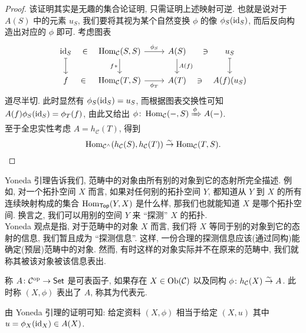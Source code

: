 \begin{proof}
    该证明其实是无趣的集合论证明, 只需证明上述映射可逆. 也就是说对于 $A(S)$ 中的元素 $u_S$, 我们要将其视为某个自然变换 $\phi$ 的像 $\phi_S(\mathrm{id}_S)$, 而后反向构造出对应的 $\phi$ 即可. 考虑图表
    \[\begin{tikzcd}
	{\identity_S} & {\Hom_{\cal{C}}(S,S)} & {A(S)} & {u_S} \\
	f & {\Hom_{\cal{C}}(T,S)} & {A(T)} & { A(f)(u_S)}
	\arrow["\in"{marking, allow upside down}, draw=none, from=1-1, to=1-2]
	\arrow[maps to, from=1-1, to=2-1]
	\arrow["{\phi_S}", from=1-2, to=1-3]
	\arrow["{f^{}*}"', from=1-2, to=2-2]
	\arrow["{A(f)}", from=1-3, to=2-3]
	\arrow["\in"{marking, allow upside down}, draw=none, from=1-4, to=1-3]
	\arrow[maps to, from=1-4, to=2-4]
	\arrow["\in"{marking, allow upside down}, draw=none, from=2-1, to=2-2]
	\arrow["{\phi_T}"', from=2-2, to=2-3]
	\arrow["\in"{marking, allow upside down}, draw=none, from=2-4, to=2-3]
    \end{tikzcd}\]
    道尽半切. 此时显然有 $\phi_S(\mathrm{id}_S) = u_S$, 而根据图表交换性可知 $A(f)\phi_S(\mathrm{id}_S) = \phi_T(f)$, 由此又给出 $\phi\colon \operatorname{Hom}_{\mathcal{C}}(-,S) \xRightarrow{\phi} A(-)$.\\
    至于全忠实性考虑 $A = h_{\mathcal{C}}(T)$, 得到 
    \[
    \operatorname{Hom}_{\mathcal{C}^{\wedge}}(h_{\mathcal{C}}(S),h_{\mathcal{C}}(T)) \stackrel{\sim}{\rightarrow} \operatorname{Hom}_{\mathcal{C}}(T,S).
    \]
\end{proof}
\begin{remark}
    Yoneda 引理告诉我们,
范畴中的对象由所有别的对象到它的态射所完全描述.
例如, 对一个拓扑空间 $X$ 而言,
如果对任何别的拓扑空间 $Y$,
都知道从 $Y$ 到 $X$ 的所有连续映射构成的集合 $\operatorname{Hom}_{\mathsf{Top}} (Y, X)$ 是什么样,
那我们也就能知道 $X$ 是哪个拓扑空间.
换言之, 我们可以用别的空间 $Y$ 来 ``探测'' $X$ 的拓扑.\\
Yoneda 观点是指, 对于范畴中的对象 $X$ 而言,
我们将 $X$ 等同于别的对象到它的态射的信息, 我们暂且成为 ``探测信息''.
这样, 一份合理的探测信息应该(通过同构)能确定(预层)范畴中的对象.
然而, 有时这样的对象实际并不在原来的范畴中, 我们就称其被该对象被该信息表出.
\end{remark}
\begin{definition}[可表性]
    称 $A \colon \mathcal{C}^{\operatorname{op}} \to \mathsf{Set}$ 是可表函子, 如果存在 $X \in \operatorname{Ob}(\cal{C})$ 以及同构 $\phi \colon h_{\cal{C}}(X) \stackrel{\sim}{\rightarrow} A$. 此时称 $(X,\phi)$ 表出了 $A$, 称其为代表元.
\end{definition}
\begin{remark}
    由 Yoneda 引理的证明可知: 给定资料 $(X,\phi)$ 相当于给定 $(X,u)$ 其中 $u = \phi_X(\mathrm{id}_X) \in A(X)$.
\end{remark}
